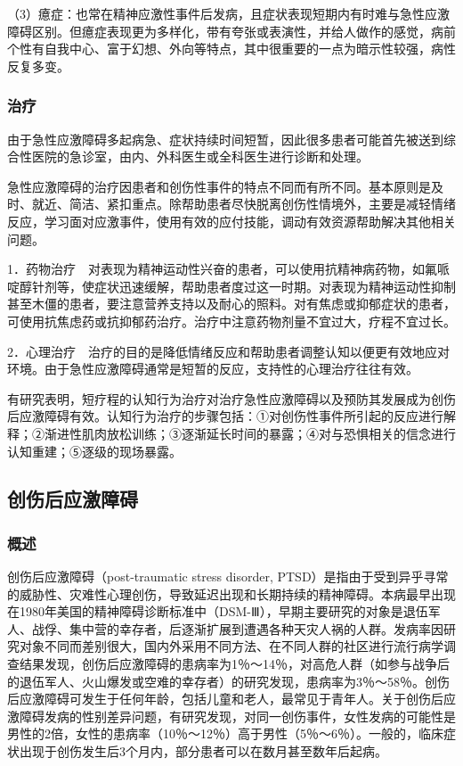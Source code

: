 （3）癔症：也常在精神应激性事件后发病，且症状表现短期内有时难与急性应激障碍区别。但癔症表现更为多样化，带有夸张或表演性，并给人做作的感觉，病前个性有自我中心、富于幻想、外向等特点，其中很重要的一点为暗示性较强，病性反复多变。

\subsubsection{治疗}

由于急性应激障碍多起病急、症状持续时间短暂，因此很多患者可能首先被送到综合性医院的急诊室，由内、外科医生或全科医生进行诊断和处理。

急性应激障碍的治疗因患者和创伤性事件的特点不同而有所不同。基本原则是及时、就近、简洁、紧扣重点。除帮助患者尽快脱离创伤性情境外，主要是减轻情绪反应，学习面对应激事件，使用有效的应付技能，调动有效资源帮助解决其他相关问题。

1．药物治疗　对表现为精神运动性兴奋的患者，可以使用抗精神病药物，如氟哌啶醇针剂等，使症状迅速缓解，帮助患者度过这一时期。对表现为精神运动性抑制甚至木僵的患者，要注意营养支持以及耐心的照料。对有焦虑或抑郁症状的患者，可使用抗焦虑药或抗抑郁药治疗。治疗中注意药物剂量不宜过大，疗程不宜过长。

2．心理治疗　治疗的目的是降低情绪反应和帮助患者调整认知以便更有效地应对环境。由于急性应激障碍通常是短暂的反应，支持性的心理治疗往往有效。

有研究表明，短疗程的认知行为治疗对治疗急性应激障碍以及预防其发展成为创伤后应激障碍有效。认知行为治疗的步骤包括：①对创伤性事件所引起的反应进行解释；②渐进性肌肉放松训练；③逐渐延长时间的暴露；④对与恐惧相关的信念进行认知重建；⑤逐级的现场暴露。

\subsection{创伤后应激障碍}

\subsubsection{概述}

创伤后应激障碍（post-traumatic stress disorder,
PTSD）是指由于受到异乎寻常的威胁性、灾难性心理创伤，导致延迟出现和长期持续的精神障碍。本病最早出现在1980年美国的精神障碍诊断标准中（DSM-Ⅲ），早期主要研究的对象是退伍军人、战俘、集中营的幸存者，后逐渐扩展到遭遇各种天灾人祸的人群。发病率因研究对象不同而差别很大，国内外采用不同方法、在不同人群的社区进行流行病学调查结果发现，创伤后应激障碍的患病率为1％～14％，对高危人群（如参与战争后的退伍军人、火山爆发或空难的幸存者）的研究发现，患病率为3％～58％。创伤后应激障碍可发生于任何年龄，包括儿童和老人，最常见于青年人。关于创伤后应激障碍发病的性别差异问题，有研究发现，对同一创伤事件，女性发病的可能性是男性的2倍，女性的患病率（10％～12％）高于男性（5％～6％）。一般的，临床症状出现于创伤发生后3个月内，部分患者可以在数月甚至数年后起病。

